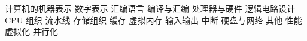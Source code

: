 \markdownRendererUlBegin
\markdownRendererUlItem 计算机的机器表示\markdownRendererInterblockSeparator
{}\markdownRendererUlBeginTight
\markdownRendererUlItem 数字表示\markdownRendererUlItemEnd 
\markdownRendererUlItem 汇编语言\markdownRendererUlItemEnd 
\markdownRendererUlItem 编译与汇编\markdownRendererUlItemEnd 
\markdownRendererUlEndTight \markdownRendererUlItemEnd 
\markdownRendererUlItem 处理器与硬件\markdownRendererInterblockSeparator
{}\markdownRendererUlBeginTight
\markdownRendererUlItem 逻辑电路设计\markdownRendererUlItemEnd 
\markdownRendererUlItem CPU 组织\markdownRendererUlItemEnd 
\markdownRendererUlItem 流水线\markdownRendererUlItemEnd 
\markdownRendererUlEndTight \markdownRendererUlItemEnd 
\markdownRendererUlItem 存储组织\markdownRendererInterblockSeparator
{}\markdownRendererUlBeginTight
\markdownRendererUlItem 缓存\markdownRendererUlItemEnd 
\markdownRendererUlItem 虚拟内存\markdownRendererUlItemEnd 
\markdownRendererUlEndTight \markdownRendererUlItemEnd 
\markdownRendererUlItem 输入输出\markdownRendererInterblockSeparator
{}\markdownRendererUlBeginTight
\markdownRendererUlItem 中断\markdownRendererUlItemEnd 
\markdownRendererUlItem 硬盘与网络\markdownRendererUlItemEnd 
\markdownRendererUlEndTight \markdownRendererUlItemEnd 
\markdownRendererUlItem 其他\markdownRendererInterblockSeparator
{}\markdownRendererUlBeginTight
\markdownRendererUlItem 性能\markdownRendererUlItemEnd 
\markdownRendererUlItem 虚拟化\markdownRendererUlItemEnd 
\markdownRendererUlItem 并行化\markdownRendererUlItemEnd 
\markdownRendererUlEndTight \markdownRendererUlItemEnd 
\markdownRendererUlEnd \relax